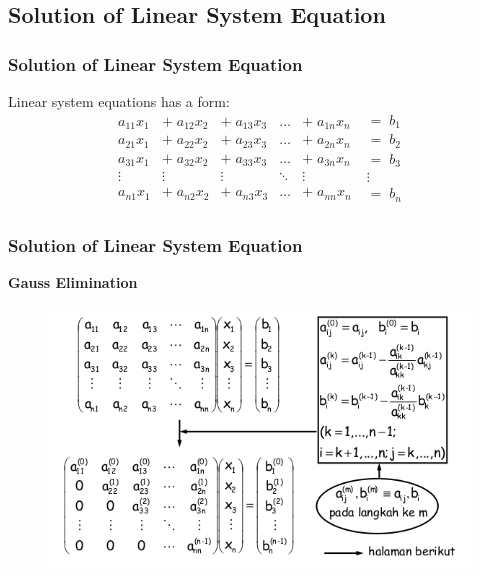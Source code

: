 \documentclass{beamer}
\begin{document}
\subsection{Solution of Linear System Equation}
\begin{frame}
\frametitle{Solution of Linear System Equation}
Linear system equations has a form:
\begin{equation}
\begin{matrix}
  a_{11}x_1 & +\; a_{12}x_2 & +\; a_{13}x_3 & \dots & +\; a_{1n}x_n \\
  a_{21}x_1 & +\; a_{22}x_2 & +\; a_{23}x_3 & \dots & +\; a_{2n}x_n \\
  a_{31}x_1 & +\; a_{32}x_2 & +\; a_{33}x_3 & \dots & +\; a_{3n}x_n \\
  \vdots & \vdots & \vdots & \ddots & \vdots \\
  a_{n1}x_1 & +\; a_{n2}x_2 & +\; a_{n3}x_3 & \dots & +\; a_{nn}x_n \\
 \end{matrix}
 \begin{matrix}
 \;=\;b_1 \\
 \;=\;b_2 \\
 \;=\;b_3 \\
 \;\vdots \\
 \;=\;b_n \\
 \end{matrix}
\end{equation}
\end{frame}

\begin{frame}
\frametitle{Solution of Linear System Equation}
\textbf{Gauss Elimination} \\
\begin{figure}
\centering
\includegraphics[scale=0.4]{sd.png}
\end{figure}
\end{frame}
\end{document}
